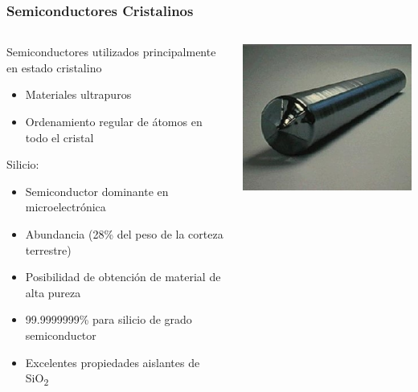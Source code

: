 \documentclass[10pt,t,aspectratio=169]{beamer}
\begin{document}
\begin{frame}[t]
  \frametitle{Semiconductores Cristalinos}
  
  \begin{columns}
  
    \begin{column}{0.75\textwidth}
    
      Semiconductores utilizados principalmente en estado cristalino
      
      \begin{itemize}
        \item Materiales ultrapuros
        \item Ordenamiento regular de átomos en todo el cristal
      \end{itemize}
      
      \vspace{3mm}
      Silicio:
      
      \begin{itemize}
        \item Semiconductor dominante en microelectrónica
        \item Abundancia (28\% del peso de la corteza terrestre)
        \item Posibilidad de obtención de material de alta pureza
        \item 99.9999999\% para silicio de grado semiconductor
        \item Excelentes propiedades aislantes de SiO\textsubscript{2}
        \end{itemize}
        
    \end{column}
    
    \begin{column}{0.25\textwidth}
    
      \centering
      \includegraphics[width=\textwidth]{./figures/lingote.jpg}


\end{column}
\end{columns}
\end{frame}
\end{document}
